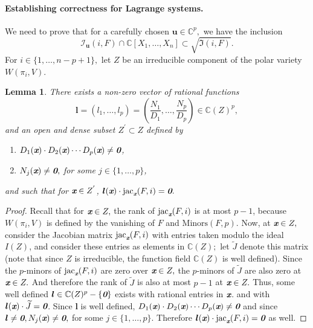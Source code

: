 \documentclass[a4paper]{article}
\def\bz{\textit{\textbf{0}}}
\def\ub{{\bm u}}
\def\lb{{\bm l}}
\def\xb{\textit{\textbf{x}}}
\def\jt{\widetilde{J}}
\DeclareMathOperator{\jac}{jac}
\def\minors{\textrm{Minors}(F,p)}
\def\C{\mathbb{C}}
\def\Wi{W(\pi_i,V)}
\def\Iir{\sqrt{\mathfrak{I}(i,F)}}
\def\ji{\jac_{\xb}(F,i)}
\def\Iil{\mathscr{I}_{\ub}(i,F)}
\newtheorem{lemma}[theorem]{Lemma}
\begin{document}
\paragraph*{Establishing correctness for Lagrange systems.}
%
We need to prove that for a carefully chosen $\ub \in \C^p,$ we have the inclusion 
\[\Iil \cap \C[X_1,\hdots,X_n] \subset \Iir.\] For $i \in \{1,\hdots,n-p+1\},$ let $Z$ be an irreducible component of the polar variety $\Wi$.
\begin{lemma}\label{lem:3.7}
There exists a non-zero vector of rational functions \[\lb = (l_1,\hdots,l_p)=\left(\frac{N_1}{D_1},\hdots,\frac{N_p}{D_p}\right)\in \C(Z)^p,\] and an open and dense subset $Z^{'} \subset Z$ defined by
\begin{enumerate}
    \item $D_1(\xb)\cdot D_2(\xb) \cdots D_p(\xb) \not = \bz$,
    \item $N_j(\xb) \not = \bz,$ for some $j \in \{1,\hdots,p\}$, 
\end{enumerate}
and such that for $\xb \in Z^{'}$, $\lb(\xb) \cdot \ji = \bz.$
%
%
\end{lemma}
%
\begin{proof}
Recall that for $\xb \in Z,$ the rank of $\ji$ is at most $p-1$, because $\Wi$ is defined by the vanishing of $F$ and $\minors$. Now,  at $\xb \in Z,$ consider the Jacobian matrix $\jac_{\xb}(F,i)$  with entries taken modulo the ideal $I(Z)$, and consider these entries as elements in $\C(Z);$ let $\jt$ denote this matrix (note that since $Z$ is irreducible, the function field $\C(Z)$ is well defined).  Since the $p$-minors of $\ji$ are zero over $\xb \in Z,$ the $p$-minors of $\jt$ are also zero at $\xb \in Z.$ And therefore the rank of $\jt$ is also at most $p-1$ at $\xb \in Z.$ Thus, some well defined $\lb \in \C(Z)^p-\{\bz\}$
exists with rational entries in $\xb$. and with $\lb({\xb}) \cdot \jt = \bz$. Since $\lb$ is well defined, $D_1(\xb)\cdot D_2(\xb) \cdots D_p(\xb) \not = \bz$ and since $\lb \not = \bz,N_j(\xb) \not = \bz,$ for some $j \in \{1,\hdots,p\}$. Therefore $\lb({\xb}) \cdot \ji = \bz$ as well.
\end{proof}
%
\end{document}
